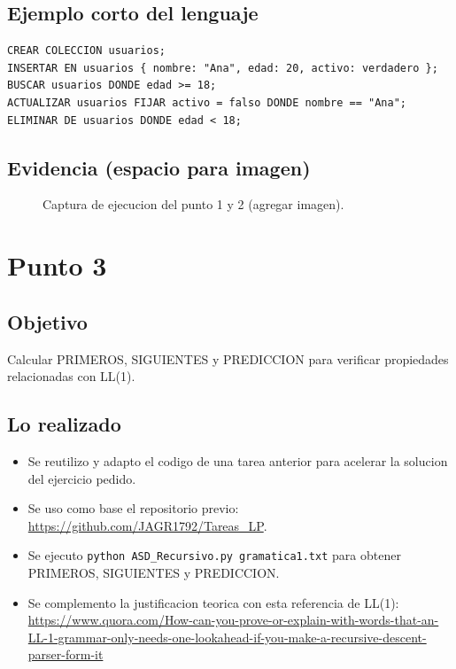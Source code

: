 \documentclass[12pt,a4paper]{article}
\begin{document}
\subsection*{Ejemplo corto del lenguaje}
\begin{verbatim}
CREAR COLECCION usuarios;
INSERTAR EN usuarios { nombre: "Ana", edad: 20, activo: verdadero };
BUSCAR usuarios DONDE edad >= 18;
ACTUALIZAR usuarios FIJAR activo = falso DONDE nombre == "Ana";
ELIMINAR DE usuarios DONDE edad < 18;
\end{verbatim}

\subsection*{Evidencia (espacio para imagen)}
\begin{figure}[H]
    \centering
    \fbox{\rule{0pt}{6cm}\rule{0.9\linewidth}{0pt}}
    \caption{Captura de ejecucion del punto 1 y 2 (agregar imagen).}
\end{figure}

\section{Punto 3}
\subsection*{Objetivo}
Calcular PRIMEROS, SIGUIENTES y PREDICCION para verificar propiedades relacionadas con LL(1).

\subsection*{Lo realizado}
\begin{itemize}
    \item Se reutilizo y adapto el codigo de una tarea anterior para acelerar la solucion del ejercicio pedido.
    \item Se uso como base el repositorio previo: \url{https://github.com/JAGR1792/Tareas_LP}.
    \item Se ejecuto \texttt{python ASD\_Recursivo.py gramatica1.txt} para obtener PRIMEROS, SIGUIENTES y PREDICCION.
    \item Se complemento la justificacion teorica con esta referencia de LL(1): \url{https://www.quora.com/How-can-you-prove-or-explain-with-words-that-an-LL-1-grammar-only-needs-one-lookahead-if-you-make-a-recursive-descent-parser-form-it}
\end{itemize}
\end{document}
